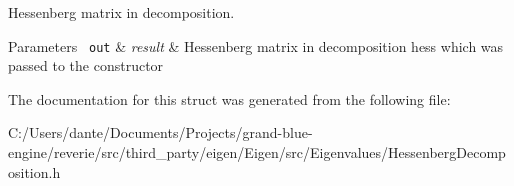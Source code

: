 Hessenberg matrix in decomposition. 


\begin{DoxyParams}[1]{Parameters}
\mbox{\texttt{ out}}  & {\em result} & Hessenberg matrix in decomposition {\ttfamily hess} which was passed to the constructor \\
\hline
\end{DoxyParams}


The documentation for this struct was generated from the following file\+:\begin{DoxyCompactItemize}
\item 
C\+:/\+Users/dante/\+Documents/\+Projects/grand-\/blue-\/engine/reverie/src/third\+\_\+party/eigen/\+Eigen/src/\+Eigenvalues/Hessenberg\+Decomposition.\+h\end{DoxyCompactItemize}
